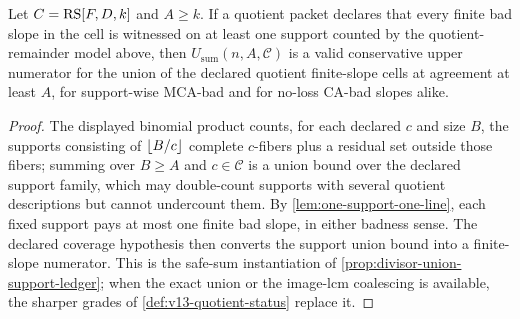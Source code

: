 \begin{proposition}\label{prop:v13-quotient-safe-sum}
Let $C=\mathrm{RS}[F,D,k]$ and $A\ge k$.  If a quotient packet declares that every finite bad slope in the cell is witnessed on at least one support counted by the quotient-remainder model above, then $U_{\mathrm{sum}}(n,A,\mathcal C)$ is a valid conservative upper numerator for the union of the declared quotient finite-slope cells at agreement at least $A$, for support-wise MCA-bad and for no-loss CA-bad slopes alike.
\end{proposition}

\begin{proof}
The displayed binomial product counts, for each declared $c$ and size $B$, the supports consisting of $\left\lfloor B/c\right\rfloor$ complete $c$-fibers plus a residual set outside those fibers; summing over $B\ge A$ and $c\in\mathcal C$ is a union bound over the declared support family, which may double-count supports with several quotient descriptions but cannot undercount them.  By \cref{lem:one-support-one-line}, each fixed support pays at most one finite bad slope, in either badness sense.  The declared coverage hypothesis then converts the support union bound into a finite-slope numerator.  This is the safe-sum instantiation of \cref{prop:divisor-union-support-ledger}; when the exact union or the image-lcm coalescing is available, the sharper grades of \cref{def:v13-quotient-status} replace it.
\end{proof}

